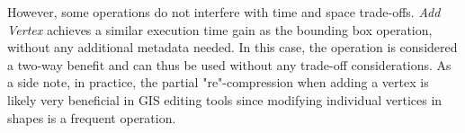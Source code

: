 However, some operations do not interfere with time and space trade-offs. \textit{Add Vertex} achieves a similar execution time gain as the bounding box operation, without any additional metadata needed. In this case, the operation is considered a two-way benefit and can thus be used without any trade-off considerations. As a side note, in practice, the partial "re"-compression when adding a vertex is likely very beneficial in GIS editing tools since modifying individual vertices in shapes is a frequent operation.




















